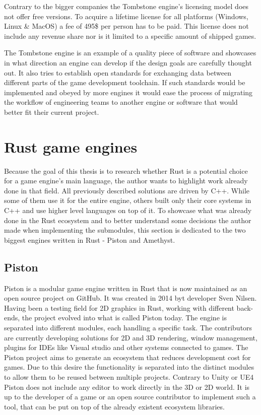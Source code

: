 Contrary to the bigger companies the Tombstone engine's licensing model does not offer free versions. To acquire a lifetime license for all platforms (Windows, Linux \& MacOS) a fee of 495\$ per person has to be paid. This license does not include any revenue share nor is it limited to a specific amount of shipped games.

The Tombstone engine is an example of a quality piece of software and showcases in what direction an engine can develop if the design goals are carefully thought out. It also tries to establish open standards for exchanging data between different parts of the game development toolchain. If such standards would be implemented and obeyed by more engines it would ease the process of migrating the workflow of engineering teams to another engine or software that would better fit their current project.

\section{Rust game engines}

Because the goal of this thesis is to research whether Rust is a potential choice for a game engine's main language, the author wants to highlight work already done in that field. All previously described solutions are driven by C++. While some of them use it for the entire engine, others built only their core systems in C++ and use higher level languages on top of it. To showcase what was already done in the Rust ecosystem and to better understand some decisions the author made when implementing the submodules, this section is dedicated to the two biggest engines written in Rust - Piston and Amethyst.

\subsection{Piston}

Piston is a modular game engine written in Rust that is now maintained as an open source project on GitHub. It was created in 2014 byt developer Sven Nilsen. Having been a testing field for 2D graphics in Rust, working with different back-ends, the project evolved into what is called Piston today. The engine is separated into different modules, each handling a specific task. The contributors are currently developing solutions for 2D and 3D rendering, window management, plugins for \acp{IDE} like Visual studio and other systems connected to games. The Piston project aims to generate an ecosystem that reduces development cost for games. Due to this desire the functionality is separated into the distinct modules to allow them to be reused between multiple projects. Contrary to Unity or \ac{UE4} Piston does not include any editor to work directly in the 3D or 2D world. It is up to the developer of a game or an open source contributor to implement such a tool, that can be put on top of the already existent ecosystem libraries.

